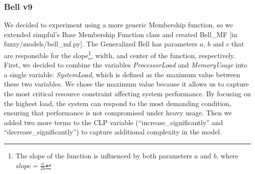 \documentclass[titlepage]{article}
\begin{document}
\subsubsection{Bell v9}
\label{sec:bell_v9}
We decided to experiment using a more generic Membership function, so we
extended simpful's Base Membership Function class and created Bell\_MF [in fuzzy/models/bell\_mf.py].
The Generalized Bell has parameters $a$, $b$ and $c$ that are responsible for the slope\footnote[1]{The slope of the function is influenced by both parameters $a$ and $b$, where $slope = \frac{a}{2b}$}, width, and center of the function, respectively.
\newline
\newline
First, we decided to combine the variables \textit{ProcessorLoad} and \textit{MemoryUsage} into a single variable: \textit{SystemLoad}, which is defined as the maximum value between these two variables. We chose the maximum value because it allows us to capture the most critical resource constraint affecting system performance. By focusing on the highest load, the system can respond to the most demanding condition, ensuring that performance is not compromised under heavy usage. Then we added two more terms to the CLP variable (``increase\_significantly'' and ``decrease\_significantly'') to capture additional complexity in the model.
\end{document}

